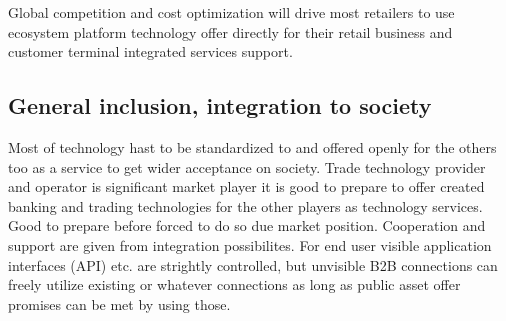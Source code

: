 Global competition and cost optimization will drive most retailers to use
ecosystem platform technology offer directly for their retail business and
customer terminal integrated services support.

\subsection{General inclusion, integration to society}
\label{inclusion}

Most of technology hast to be standardized to and offered openly for the
others too as a service to get wider acceptance on society. Trade technology
provider and operator is significant market player it is good to prepare to
offer created banking and trading technologies for the other players as
technology services. Good to prepare before forced to do so due market
position. Cooperation and support are given from integration possibilites.
For end user visible application interfaces (API) etc. are strightly
controlled, but unvisible B2B connections can freely utilize existing or
whatever connections as long as public asset offer promises can be met by
using those.


